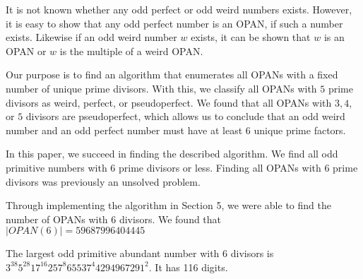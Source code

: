 \documentclass[../paper.tex]{article}
\begin{document}
It is not known whether any odd perfect or odd weird numbers
exists. However, it is easy to show that any odd perfect number is
an OPAN, if such a number exists. Likewise if an odd weird number
$w$ exists, it can be shown that $w$ is an OPAN or $w$ is the
multiple of a weird OPAN.

Our purpose is to find an algorithm that enumerates all OPANs
with a fixed number of unique prime divisors. With this, we
classify all OPANs with $5$ prime divisors as weird, perfect, or pseudoperfect.
We found that all OPANs with $3, 4$, or $5$ divisors are pseudoperfect,
which allows us to conclude that an odd weird number and an odd perfect number must have at least $6$ unique prime factors.

In this paper, we succeed in finding the described algorithm. We 
find all odd primitive numbers with $6$ prime divisors or less. 
Finding all OPANs with $6$ prime divisors 
was previously an unsolved problem\cite{amato}.

Through implementing the algorithm in Section 5, we were able to find the
number of OPANs with 6 divisors. We found that $|OPAN(6)| = 59687996404445$


The largest odd primitive abundant number with 6 divisors is
$3^{38} 5^{28} 17^{16} 257^8 65537^4 4294967291^2$. It has 116 digits.





\end{document}

